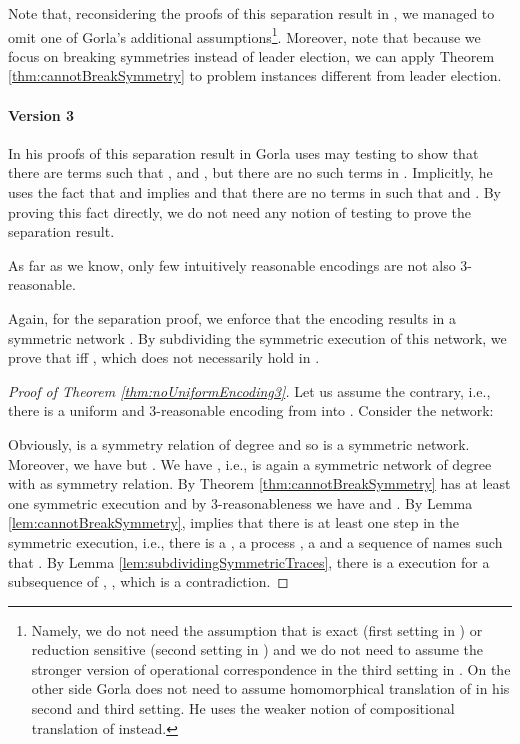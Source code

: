 \documentclass[11pt,techReport]{eptcs}
\begin{document}
Note that, reconsidering the proofs of this separation result in \cite{gorla08d}, we managed to omit one of Gorla's additional assumptions\footnote{Namely, we do not need the assumption that  is exact (first setting in \cite{gorla08d}) or reduction sensitive (second setting in \cite{gorla08d}) and we do not need to assume the stronger version of operational correspondence in the third setting in \cite{gorla08d}. On the other side Gorla does not need to assume homomorphical translation of  in his second and third setting. He uses the weaker notion of compositional translation of  instead.}. Moreover, note that because we focus on breaking symmetries instead of leader election, we can apply Theorem \ref{thm:cannotBreakSymmetry} to problem instances different from leader election.



\paragraph{Version 3}

In his proofs of this separation result in \cite{gorla08d} Gorla uses may testing to show that there are terms  such that ,  and , but there are no such terms in \procsep. Implicitly, he uses the fact that  and  implies  and that there are no terms  in \procsep such that  and . By proving this fact directly, we do not need any notion of testing to prove the separation result.


As far as we know, only few intuitively reasonable encodings are not also 3-reasonable.

Again, for the separation proof, we enforce that the encoding results in a symmetric network . By subdividing the symmetric execution of this network, we prove that  iff , which does not necessarily hold in \pimix.

\begin{proof}[Proof of Theorem \ref{thm:noUniformEncoding3}]
	Let us assume the contrary, i.e., there is a uniform and 3-reasonable encoding  from \pimix into \pisep. Consider the network:
	
	Obviously,  is a symmetry relation of degree  and so  is a symmetric network. Moreover, we have  but . We have , i.e.,  is again a symmetric network of degree  with  as symmetry relation. By Theorem \ref{thm:cannotBreakSymmetry}  has at least one symmetric execution and by 3-reasonableness we have  and . By Lemma \ref{lem:cannotBreakSymmetry},  implies that there is at least one step in the symmetric execution, i.e., there is a , a process , a  and a sequence of names  such that . By Lemma \ref{lem:subdividingSymmetricTraces}, there is a execution  for a subsequence  of , , which is a contradiction.
\end{proof}
\end{document}
